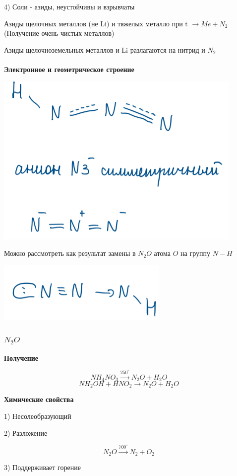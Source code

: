 4) Соли - азиды, неустойчивы и взрывчаты

Азиды щелочных металлов (не Li) и тяжелых металло при t $\rightarrow Me + N_2$
(Получение очень чистых металлов)

Азиды щелочноземельных металлов и Li разлагаются на нитрид и $N_2$\\
\\

\textbf{Электронное и геометрическое строение}

\includegraphics{images/8v5.png}

Можно рассмотреть как результат замены в $N_2O$ атома $O$ на группу $N-H$

\includegraphics{images/8v6.png}

\subsubsection*{$N_2O$}

\textbf{Получение}

$$NH_4NO_3 \xrightarrow{250^{\circ}} N_2O + H_2O$$
$$NH_2OH + HNO_2 \rightarrow N_2O + H_2O$$

\textbf{Химические свойства}

1) Несолеобразующий

2) Разложение

$$N_2O \xrightarrow{700^{\circ}} N_2 +O_2$$

3) Поддерживает горение

